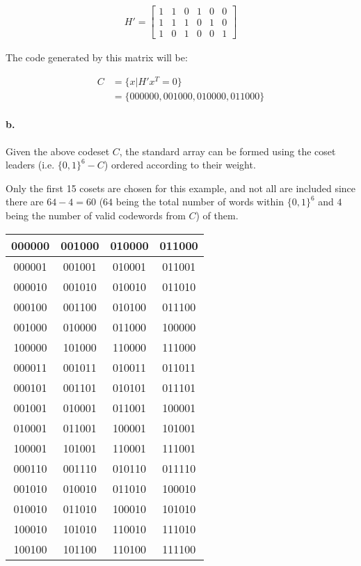 \documentclass{article}
\begin{document}
\begin{align*}
  H'=\begin{bmatrix}
    1 & 1 & 0 & 1 & 0 & 0 \\
    1 & 1 & 1 & 0 & 1 & 0 \\
    1 & 0 & 1 & 0 & 0 & 1
  \end{bmatrix}
\end{align*}

The code generated by this matrix will be:

\begin{align*}
  C&=\{x|H'x^T=0\}\\
   &=\{000000, 001000, 010000, 011000\}
\end{align*}

\paragraph{b.} Given the above codeset $C$, the standard array can be formed
using the coset leaders (i.e. $\{0,1\}^6-C$) ordered according to their weight.

Only the first 15 cosets are chosen for this example, and not all are included
since there are $64-4=60$ ($64$ being the total number of words within $\{0,1\}^6$
and $4$ being the number of valid codewords from $C$) of them.

\begin{center}
  \begin{tabular}{c|c c c}
    000000 & 001000 & 010000 & 011000 \\
    \hline
    000001 & 001001 & 010001 & 011001 \\
    000010 & 001010 & 010010 & 011010 \\
    000100 & 001100 & 010100 & 011100 \\
    001000 & 010000 & 011000 & 100000 \\
    100000 & 101000 & 110000 & 111000 \\
    000011 & 001011 & 010011 & 011011 \\
    000101 & 001101 & 010101 & 011101 \\
    001001 & 010001 & 011001 & 100001 \\
    010001 & 011001 & 100001 & 101001 \\
    100001 & 101001 & 110001 & 111001 \\
    000110 & 001110 & 010110 & 011110 \\
    001010 & 010010 & 011010 & 100010 \\
    010010 & 011010 & 100010 & 101010 \\
    100010 & 101010 & 110010 & 111010 \\
    100100 & 101100 & 110100 & 111100 \\
  \end{tabular}
\end{center}
\end{document}

